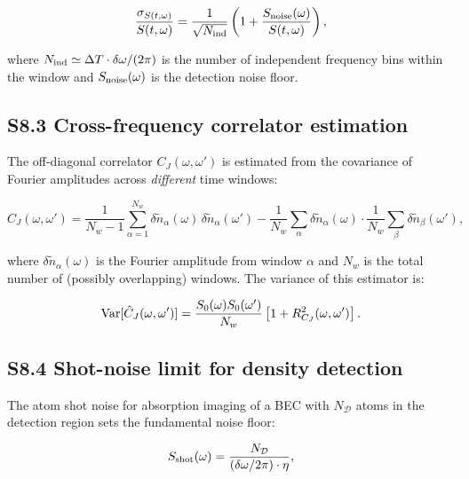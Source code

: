 \documentclass[prd,aps,showpacs,superscriptaddress,twocolumn]{revtex4-2}
\begin{document}
\begin{equation}
\frac{\sigma_{S(t,\omega)}}{S(t,\omega)} = \frac{1}{\sqrt{N_{\rm ind}}} \left(1 + \frac{S_{\rm noise}(\omega)}{S(t,\omega)}\right),
\label{eq:sigma_S}
\end{equation}

where $N_{\rm ind} \simeq \Delta T \cdot \delta\omega / (2\pi)$ is the number of independent frequency bins within the window and $S_{\rm noise}(\omega)$ is the detection noise floor.

\subsection{S8.3 Cross-frequency correlator estimation}

The off-diagonal correlator $C_J(\omega,\omega')$ is estimated from the covariance of Fourier amplitudes across \emph{different} time windows:

\begin{equation}
\hat{C}_J(\omega,\omega') = \frac{1}{N_w - 1} \sum_{\alpha=1}^{N_w} \delta\tilde{n}_\alpha(\omega) \, \delta\tilde{n}_\alpha(\omega') - \frac{1}{N_w} \sum_\alpha \delta\tilde{n}_\alpha(\omega) \cdot \frac{1}{N_w} \sum_\beta \delta\tilde{n}_\beta(\omega'),
\label{eq:CJ_estimator}
\end{equation}

where $\delta\tilde{n}_\alpha(\omega)$ is the Fourier amplitude from window $\alpha$ and $N_w$ is the total number of (possibly overlapping) windows. The variance of this estimator is:

\begin{equation}
{\rm Var}[\hat{C}_J(\omega,\omega')] = \frac{S_0(\omega) S_0(\omega')}{N_w} \left[ 1 + R_{C_J}^2(\omega,\omega') \right].
\label{eq:var_CJ}
\end{equation}

\subsection{S8.4 Shot-noise limit for density detection}

The atom shot noise for absorption imaging of a BEC with $N_{\mathcal{D}}$ atoms in the detection region sets the fundamental noise floor:

\begin{equation}
S_{\rm shot}(\omega) = \frac{N_{\mathcal{D}}}{(\delta\omega / 2\pi) \cdot \eta},
\label{eq:shot_noise}
\end{equation}
\end{document}
